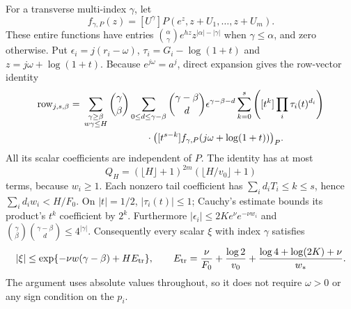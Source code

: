 \documentclass[11pt]{article}
\theoremstyle{definition}
\theoremstyle{remark}
\numberwithin{equation}{section}
\begin{document}
For a transverse multi-index $\gamma$, let
\[
 f_{\gamma,P}(z)=[U^\gamma]P(e^z,z+U_1,\ldots,z+U_m).
\]
These entire functions have entries
$\binom\alpha\gamma e^{hz}z^{|\alpha|-|\gamma|}$ when
$\gamma\le\alpha$, and zero otherwise.
Put $\epsilon_i=j(r_i-\omega)$, $\tau_i=G_i-\log(1+t)$ and
$z=j\omega+\log(1+t)$.  Because $e^{j\omega}=a^j$, direct expansion
gives the row-vector identity
\begin{equation}
\begin{aligned}
 \operatorname{row}_{j,s,\beta}
 ={}&\sum_{\substack{\gamma\ge\beta\\w\gamma\le H}}
       \binom\gamma\beta
       \sum_{0\le d\le\gamma-\beta}\binom{\gamma-\beta}{d}
       \epsilon^{\gamma-\beta-d}
       \sum_{k=0}^s
       \left([t^k]\prod_i\tau_i(t)^{d_i}\right)\\
 &\hspace{23mm}\cdot
       \bigl([t^{s-k}]f_{\gamma,P}(j\omega+\log(1+t))\bigr)_P.
\end{aligned}
\label{rat:row-identity}
\end{equation}
All its scalar coefficients are independent of $P$.  The identity has
at most
\[
 Q_H=(\lfloor H\rfloor+1)^{2m}(\lfloor H/v_0\rfloor+1)
\]
terms, because $w_i\ge1$.  Each nonzero tail coefficient has
$\sum_id_iT_i\le k\le s$, hence
$\sum_id_iw_i<H/F_0$.  On $|t|=1/2$, $|\tau_i(t)|\le1$;
Cauchy's estimate bounds its product's $t^k$ coefficient by $2^k$.
Furthermore
$|\epsilon_i|\le2Ke^\nu e^{-\nu w_i}$ and
$\binom\gamma\beta\binom{\gamma-\beta}{d}\le4^{|\gamma|}$.
Consequently every scalar $\xi$ with index $\gamma$ satisfies
\begin{equation}
 |\xi|\le\exp\{-\nu w(\gamma-\beta)+H E_{\rm tr}\},
 \qquad
 E_{\rm tr}=\frac{\nu}{F_0}+\frac{\log2}{v_0}
       +\frac{\log4+\log(2K)+\nu}{w_*}.
 \label{rat:translation-bound}
\end{equation}
The argument uses absolute values throughout, so it does not require
$\omega>0$ or any sign condition on the $p_i$.
\end{document}
